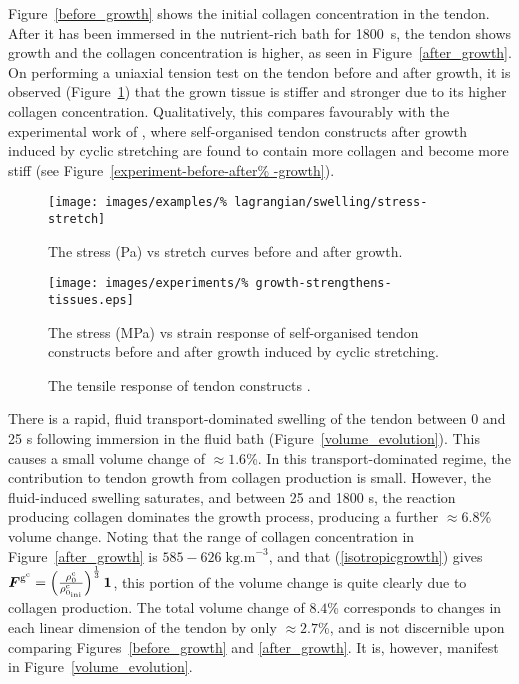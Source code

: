 Figure~\ref{before_growth} shows the initial collagen concentration in
the tendon. After it has been immersed in the nutrient-rich bath for
1800~s, the tendon shows growth and the collagen concentration is
higher, as seen in Figure~\ref{after_growth}. On performing a uniaxial
tension test on the tendon before and after growth, it is observed
(Figure~\ref{stress_strain}) that the grown tissue is stiffer and
stronger due to its higher collagen concentration. Qualitatively, this
compares favourably with the experimental work of
\citet{arrudaetal05}, where self-organised tendon constructs after
growth induced by cyclic stretching are found to contain more collagen
and become more stiff (see Figure~\ref{experiment-before-after%
-growth}).

\begin{figure}[!hpt]
  \centering
  \texttt{[image: images/examples/\%
    lagrangian/swelling/stress-stretch]}
  \caption{The stress (Pa) vs stretch curves before and after growth.}
  \label{stress_strain}
\end{figure}

\begin{figure}[!hpt]
  \begin{center}
    \texttt{[image: images/experiments/\%
      growth-strengthens-tissues.eps]}    
    \caption{The tensile response of tendon constructs
      \citep{arrudaetal05}.}
    \label{experiment-before-after-growth}
  \end{center}
  {The stress (MPa) vs strain response of self-organised tendon
    constructs before and after growth induced by cyclic stretching.}
\end{figure}

There is a rapid, fluid transport-dominated swelling of the tendon
between 0 and 25 s following immersion in the fluid bath
(Figure~\ref{volume_evolution}). This causes a small volume change of
$\approx 1.6$\%. In this transport-dominated regime, the contribution
to tendon growth from collagen production is small. However, the
fluid-induced swelling saturates, and between 25 and 1800 s, the
reaction producing collagen dominates the growth process, producing a
further $\approx 6.8$\% volume change. Noting that the range of
collagen concentration in Figure~\ref{after_growth} is $585-626\;
\mbox{kg.m}^{-3}$, and that (\ref{isotropicgrowth}) gives
$\mbox{\boldmath$ F$}^{\mathrm{g}^\mathrm{c}} = \left( \frac{\rho_0^\mathrm{c}}
{\rho_{0_{\mathrm{ini}}} ^\mathrm{c}} \right) ^ {\frac{1}{3}}
{\bf 1}$, this portion of the volume change is quite clearly due
to collagen production. The total volume change of $8.4$\%
corresponds to changes in each linear dimension of the tendon by
only $\approx 2.7$\%, and is not discernible upon comparing
Figures~\ref{before_growth} and \ref{after_growth}. It is,
however, manifest in Figure~\ref{volume_evolution}.

